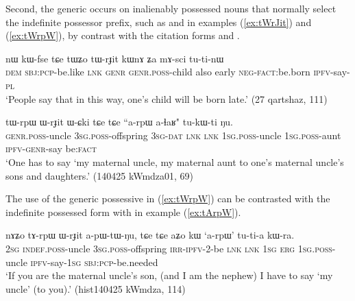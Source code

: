 Second, the generic  occurs on inalienably possessed nouns that normally select the  indefinite possessor prefix, such as  and  in examples (\ref{ex:tWrJit}) and (\ref{ex:tWrpW}), by contrast with the citation forms   and .

\begin{exe}
\ex \label{ex:tWrJit}
\gll nɯ  kɯ-fse  tɕe  tɯʑo  tɯ-rɟit  kɯnɤ  ʑa  mɤ-sci  tu-ti-nɯ \\
\textsc{dem} \textsc{sbj}:\textsc{pcp}-be.like \textsc{lnk} \textsc{genr} \textsc{genr}.\textsc{poss}-child also early \textsc{neg}-\textsc{fact}:be.born \textsc{ipfv}-say-\textsc{pl} \\
\glt `People say that in this way, one's child will be born late.' (27 qartshaz, 111)
\end{exe}

\begin{exe}
\ex \label{ex:tWrpW}
\gll  tɯ-rpɯ  ɯ-rɟit  ɯ-ɕki  tɕe  tɕe  ``a-rpɯ a-ɬaʁ"  tu-kɯ-ti  ŋu. \\
\textsc{genr}.\textsc{poss}-uncle \textsc{3sg}.\textsc{poss}-offspring \textsc{3sg}-\textsc{dat} \textsc{lnk} \textsc{lnk} \textsc{1sg}.\textsc{poss}-uncle \textsc{1sg}.\textsc{poss}-aunt \textsc{ipfv}-\textsc{genr}-say  be:\textsc{fact} \\
\glt `One has to say `my maternal uncle, my maternal aunt to one's maternal uncle's sons and daughters.' (140425 kWmdza01, 69)
\end{exe}

The use of the generic possessive  in (\ref{ex:tWrpW}) can be contrasted with the indefinite possessed form with  in example (\ref{ex:tArpW}).

\begin{exe}
\ex  \label{ex:tArpW}
\gll
nɤʑo  tɤ-rpɯ  ɯ-rɟit  a-pɯ-tɯ-ŋu,  tɕe  tɕe  aʑo  kɯ  `a-rpɯ'  tu-ti-a  kɯ-ra.  \\
\textsc{2sg} \textsc{indef}.\textsc{poss}-uncle \textsc{3sg}.\textsc{poss}-offspring \textsc{irr}-\textsc{ipfv}-2-be \textsc{lnk} \textsc{lnk} \textsc{1sg} \textsc{erg}  \textsc{1sg}.\textsc{poss}-uncle \textsc{ipfv}-say-\textsc{1sg} \textsc{sbj}:\textsc{pcp}-be.needed  \\
\glt `If you are the maternal uncle's son, (and I am the nephew) I have to say `my uncle' (to you).'  (hist140425 kWmdza, 114)
\end{exe}

